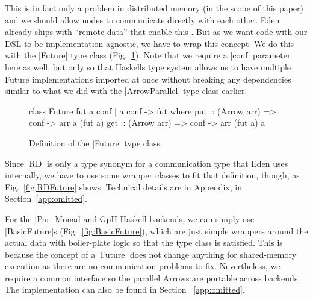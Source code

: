 This is in fact only a problem in distributed memory (in the scope of this paper) and we should allow nodes to communicate directly with each other. Eden already ships with \enquote{remote data} that enable this \cite{AlGo03a,Dieterle2010}.
But as we want code with our DSL to be implementation agnostic, we have to wrap this concept. We do this with the |Future| type class (Fig.~\ref{fig:future}). Note that we require a |conf| parameter here as well, but only so that Haskells type system allows us to have multiple Future implementations imported at once without breaking any dependencies similar to what we did with the |ArrowParallel| type class earlier.
\begin{figure}[h]
\begin{code}
class Future fut a conf | a conf -> fut where
    put :: (Arrow arr) => conf -> arr a (fut a)
    get :: (Arrow arr) => conf -> arr (fut a) a
\end{code}
\caption{Definition of the |Future| type class.}
\label{fig:future}
\end{figure}
Since |RD| is only a type synonym for a communication type that Eden uses internally, we have to use some wrapper classes to fit that definition, though, as Fig.~\ref{fig:RDFuture} shows. %
Technical details are in Appendix, in Section~\ref{app:omitted}.

For the |Par| Monad and GpH Haskell backends, we can simply use |BasicFuture|s (Fig.~\ref{fig:BasicFuture}), which are just simple wrappers around the actual data with boiler-plate logic so that the type class is satisfied. This is because the concept of a |Future| does not change anything for shared-memory execution as there are no communication problems to fix. Nevertheless, we require a common interface so the parallel Arrows are portable across backends. The implementation can also be found in Section ~\ref{app:omitted}.

